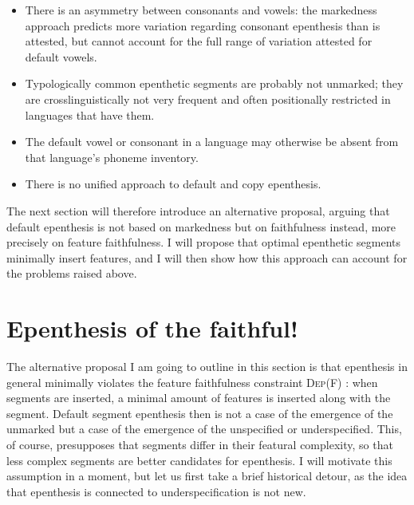 \documentclass[output=paper,colorlinks,citecolor=brown]{langscibook}
\begin{document}
\begin{itemize}
    \item There is an asymmetry between consonants and vowels: the markedness approach predicts more variation regarding consonant epenthesis than is attested, but cannot account for the full range of variation attested for default vowels.
    \item Typologically common epenthetic segments are probably not unmarked; they are crosslinguistically not very frequent and often positionally restricted in languages that have them.
    \item The default vowel or consonant in a language may otherwise be absent from that language's phoneme inventory.
    \item There is no unified approach to default and copy epenthesis.
\end{itemize}

The next section will therefore introduce an alternative proposal, arguing that default epenthesis is not based on markedness but on faithfulness instead, more precisely on feature faithfulness. I will propose that optimal epenthetic segments minimally insert features, and I will then show how this approach can account for the problems raised above.



\section{Epenthesis of the faithful!} \label{uffmann:epfaith}

The alternative proposal I am going to outline in this section is that epenthesis in general minimally violates the feature faithfulness constraint \textsc{Dep}(F) \citep{zollphd}: when segments are inserted, a minimal amount of features is inserted along with the segment. Default segment epenthesis then is not a case of the emergence of the unmarked but a case of the emergence of the unspecified or underspecified. This, of course, presupposes that segments differ in their featural complexity, so that less complex segments are better candidates for epenthesis. I will motivate this assumption in a moment, but let us first take a brief historical detour, as the idea that epenthesis is connected to underspecification is not new.
\end{document}
